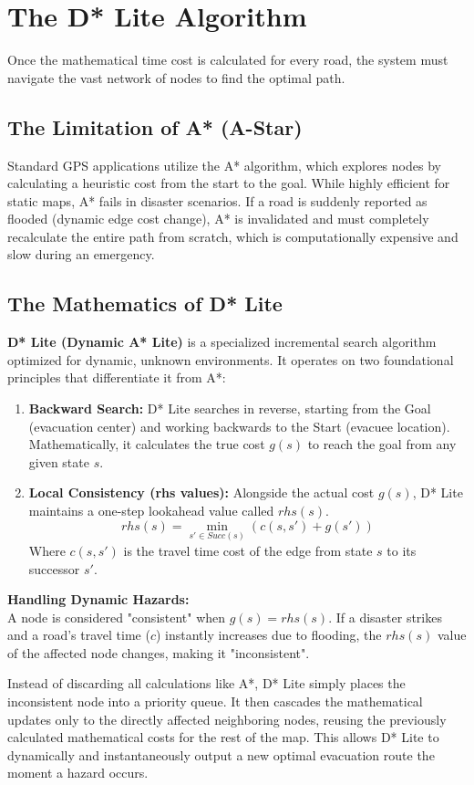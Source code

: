 \documentclass[12pt, a4paper]{article}
\begin{document}
\section{The D* Lite Algorithm}
Once the mathematical time cost is calculated for every road, the system must navigate the vast network of nodes to find the optimal path.

\subsection{The Limitation of A* (A-Star)}
Standard GPS applications utilize the A* algorithm, which explores nodes by calculating a heuristic cost from the start to the goal. While highly efficient for static maps, A* fails in disaster scenarios. If a road is suddenly reported as flooded (dynamic edge cost change), A* is invalidated and must completely recalculate the entire path from scratch, which is computationally expensive and slow during an emergency.

\subsection{The Mathematics of D* Lite}
\textbf{D* Lite (Dynamic A* Lite)} is a specialized incremental search algorithm optimized for dynamic, unknown environments. It operates on two foundational principles that differentiate it from A*:

\begin{enumerate}
    \item \textbf{Backward Search:} D* Lite searches in reverse, starting from the Goal (evacuation center) and working backwards to the Start (evacuee location). Mathematically, it calculates the true cost $g(s)$ to reach the goal from any given state $s$.
    \item \textbf{Local Consistency (rhs values):} Alongside the actual cost $g(s)$, D* Lite maintains a one-step lookahead value called $rhs(s)$. 
    \begin{equation}
        rhs(s) = \min_{s' \in Succ(s)} (c(s, s') + g(s'))
    \end{equation}
    Where $c(s, s')$ is the travel time cost of the edge from state $s$ to its successor $s'$.
\end{enumerate}

\textbf{Handling Dynamic Hazards:} \\
A node is considered "consistent" when $g(s) = rhs(s)$. If a disaster strikes and a road's travel time ($c$) instantly increases due to flooding, the $rhs(s)$ value of the affected node changes, making it "inconsistent". 

Instead of discarding all calculations like A*, D* Lite simply places the inconsistent node into a priority queue. It then cascades the mathematical updates only to the directly affected neighboring nodes, reusing the previously calculated mathematical costs for the rest of the map. This allows D* Lite to dynamically and instantaneously output a new optimal evacuation route the moment a hazard occurs.
\end{document}
